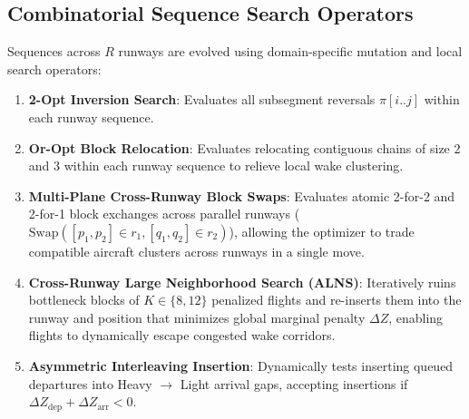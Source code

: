 \documentclass[10pt,journal,compsoc]{IEEEtran}
\begin{document}
\subsection{Combinatorial Sequence Search Operators}
Sequences across $R$ runways are evolved using domain-specific mutation and local search operators:
\begin{enumerate}
    \item \textbf{2-Opt Inversion Search}: Evaluates all subsegment reversals $\pi[i..j]$ within each runway sequence.
    \item \textbf{Or-Opt Block Relocation}: Evaluates relocating contiguous chains of size $2$ and $3$ within each runway sequence to relieve local wake clustering.
    \item \textbf{Multi-Plane Cross-Runway Block Swaps}: Evaluates atomic 2-for-2 and 2-for-1 block exchanges across parallel runways ($\text{Swap}([p_1, p_2] \in r_1, [q_1, q_2] \in r_2)$), allowing the optimizer to trade compatible aircraft clusters across runways in a single move.
    \item \textbf{Cross-Runway Large Neighborhood Search (ALNS)}: Iteratively ruins bottleneck blocks of $K \in \{8, 12\}$ penalized flights and re-inserts them into the runway and position that minimizes global marginal penalty $\Delta Z$, enabling flights to dynamically escape congested wake corridors.
    \item \textbf{Asymmetric Interleaving Insertion}: Dynamically tests inserting queued departures into Heavy $\to$ Light arrival gaps, accepting insertions if $\Delta Z_{\text{dep}} + \Delta Z_{\text{arr}} < 0$.
\end{enumerate}
\end{document}
